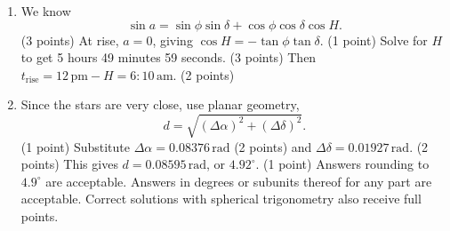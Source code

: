 \begin{enumerate}
\item We know
\[\sin a=\sin\phi\sin\delta+\cos\phi\cos\delta\cos H.\]
\hfill(3 points)
At rise, $a=0$, giving $\cos H=-\tan\phi\tan\delta$. \hfill(1 point)
Solve for $H$ to get 5 hours 49 minutes 59 seconds. \hfill(3 points)
Then $t_{\mathrm{rise}}=12\,\mathrm{pm}-H=6{:}10\,\mathrm{am}$. \hfill(2 points)
\item Since the stars are very close, use planar geometry,
\[d=\sqrt{(\Delta\alpha)^2+(\Delta\delta)^2}.\]
\hfill(1 point)
Substitute $\Delta\alpha=0.08376\,\mathrm{rad}$ \hfill(2 points)
and $\Delta\delta=0.01927\,\mathrm{rad}$. \hfill(2 points)
This gives $d=0.08595\,\mathrm{rad}$, or $4.92^\circ$. \hfill(1 point)
Answers rounding to $4.9^\circ$ are acceptable. Answers in degrees or subunits thereof for any part are acceptable. Correct solutions with spherical trigonometry also receive full points.
\end{enumerate}
